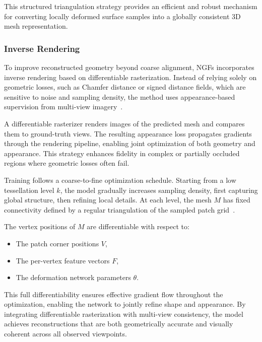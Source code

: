 This structured triangulation strategy provides an efficient and robust mechanism for converting locally deformed surface samples into a globally consistent 3D mesh representation.

\subsubsection{Inverse Rendering}

To improve reconstructed geometry beyond coarse alignment, NGFs incorporates inverse rendering based on differentiable rasterization.
Instead of relying solely on geometric losses, such as Chamfer distance or signed distance fields, which are sensitive to noise and sampling density, the method uses appearance-based supervision from multi-view imagery~\cite{Hasselgren2021}.

A differentiable rasterizer renders images of the predicted mesh and compares them to ground-truth views.
The resulting appearance loss propagates gradients through the rendering pipeline, enabling joint optimization of both geometry and appearance.
This strategy enhances fidelity in complex or partially occluded regions where geometric losses often fail.

Training follows a coarse-to-fine optimization schedule.
Starting from a low tessellation level $k$, the model gradually increases sampling density, first capturing global structure, then refining local details.
At each level, the mesh $M$ has fixed connectivity defined by a regular triangulation of the sampled patch grid~\cite{sivaram2024}.

The vertex positions of $M$ are differentiable with respect to:
\begin{itemize}
    \item The patch corner positions $V$,
    \item The per-vertex feature vectors $F$,
    \item The deformation network parameters $\theta$.
\end{itemize}

This full differentiability ensures effective gradient flow throughout the optimization, enabling the network to jointly refine shape and appearance.
By integrating differentiable rasterization with multi-view consistency, the model achieves reconstructions that are both geometrically accurate and visually coherent across all observed viewpoints.

\begin{table}[h]
\centering
{}
\caption{Runtime statistics for NGF training and inference at resolution $k = 16$ using an RTX 2080 Ti GPU.}
\label{tab:ngf-times}
\end{table}

